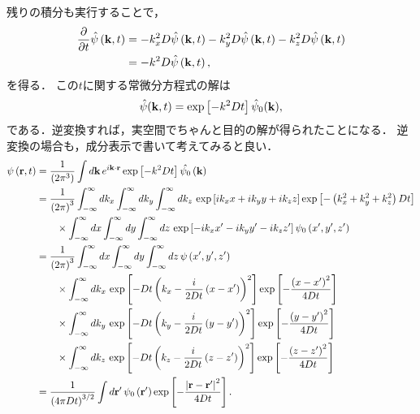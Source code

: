 残りの積分も実行することで，
\begin{align}
 \dfrac{\partial}{\partial t}\hat{\psi}\left({\bf k},t\right) & =-k_{x}^{2}D\hat{\psi}\left({\bf k},t\right)-k_{y}^{2}D\hat{\psi}\left({\bf k},t\right)-k_{z}^{2}D\hat{\psi}\left({\bf k},t\right)\notag\\
 & =-k^{2}D\hat{\psi}\left({\bf k},t\right),
\end{align}
を得る．
この$t$に関する常微分方程式の解は
\begin{align}
 \hat{\psi}({\bf k},t) = \exp\left[-k^2 D t\right] \hat{\psi}_{0}({\bf k}), 
\end{align}
である．逆変換すれば，実空間でちゃんと目的の解が得られたことになる．
逆変換の場合も，成分表示で書いて考えてみると良い．
\begin{align}
\psi\left({\bf r},t\right) & =\dfrac{1}{\left(2\pi^{3}\right)}\int d{\bf k}\,e^{i{\bf k}\cdot{\bf r}}\exp\left[-k^{2}Dt\right]\hat{\psi_{0}}\left({\bf k}\right)\notag\\
 & =\dfrac{1}{\left(2\pi\right)^{3}}\int_{-\infty}^{\infty}dk_{x}\int_{-\infty}^{\infty}dk_{y}\int_{-\infty}^{\infty}dk_{z}\,\exp\left[ik_{x}x+ik_{y}y+ik_{z}z\right]\exp\left[-\left(k_{x}^{2}+k_{y}^{2}+k_{z}^{2}\right)Dt\right]\notag\\
 & \qquad\times\int_{-\infty}^{\infty}dx\int_{-\infty}^{\infty}dy\int_{-\infty}^{\infty}dz\,\exp\left[-ik_{x}x^{\prime}-ik_{y}y^{\prime}-ik_{z}z^{\prime}\right]\psi_{0}\left(x^{\prime},y^{\prime},z^{\prime}\right)\notag\\
 & =\dfrac{1}{\left(2\pi\right)^{3}}\int_{-\infty}^{\infty}dx\int_{-\infty}^{\infty}dy\int_{-\infty}^{\infty}dz\,\psi\left(x^{\prime},y^{\prime},z^{\prime}\right)\notag\\
 & \qquad\times\int_{-\infty}^{\infty}dk_{x}\,\exp\left[-Dt\left(k_{x}-\dfrac{i}{2Dt}\left(x-x^{\prime}\right)\right)^{2}\right]\exp\left[-\dfrac{\left(x-x^{\prime}\right)^{2}}{4Dt}\right]\notag\\
 & \qquad\times\int_{-\infty}^{\infty}dk_{y}\,\exp\left[-Dt\left(k_{y}-\dfrac{i}{2Dt}\left(y-y^{\prime}\right)\right)^{2}\right]\exp\left[-\dfrac{\left(y-y^{\prime}\right)^{2}}{4Dt}\right]\notag\\
 & \qquad\times\int_{-\infty}^{\infty}dk_{z}\,\exp\left[-Dt\left(k_{z}-\dfrac{i}{2Dt}\left(z-z^{\prime}\right)\right)^{2}\right]\exp\left[-\dfrac{\left(z-z^{\prime}\right)^{2}}{4Dt}\right]\notag\\
 & =\dfrac{1}{\left(4\pi Dt\right)^{3/2}}\int d{\bf r}^{\prime}\,\psi_{0}\left({\bf r}^{\prime}\right)\exp\left[-\dfrac{\left|{\bf r}-{\bf r}^{\prime}\right|^{2}}{4Dt}\right].
\end{align}
%

